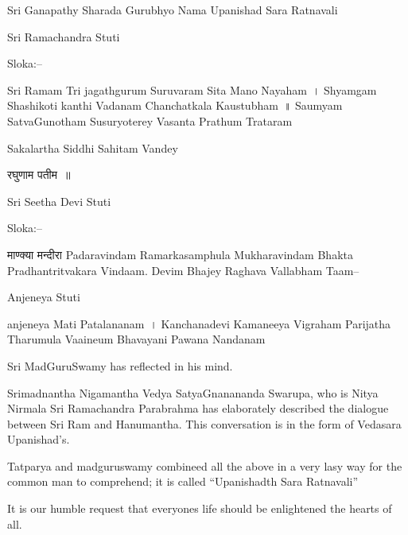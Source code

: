 
Sri Ganapathy Sharada Gurubhyo Nama Upanishad Sara Ratnavali

Sri Ramachandra Stuti

Sloka:–

 Sri Ramam Tri jagathgurum Suruvaram Sita Mano Nayaham~।
 Shyamgam Shashikoti kanthi Vadanam Chanchatkala Kaustubham~॥
 Saumyam SatvaGunotham Susuryoterey Vasanta Prathum Trataram

Sakalartha Siddhi Sahitam Vandey

रघुणाम पतीम~॥

Sri Seetha Devi Stuti

Sloka:–

 माण्क्या मन्दीरा Padaravindam
 Ramarkasamphula Mukharavindam
 Bhakta Pradhantritvakara Vindaam.
 Devim Bhajey Raghava Vallabham Taam–

Anjeneya Stuti

 anjeneya Mati Patalananam~।
 Kanchanadevi Kamaneeya Vigraham
 Parijatha Tharumula Vaaineum
 Bhavayani Pawana Nandanam

Sri MadGuruSwamy has reflected in his mind.

Srimadnantha Nigamantha Vedya SatyaGnanananda Swarupa, who is Nitya Nirmala Sri Ramachandra Parabrahma has elaborately described the dialogue between Sri Ram and Hanumantha. This conversation is in the form of Vedasara Upanishad's.

Tatparya and madguruswamy combineed all the above in a very lasy way for the common man to comprehend; it is called “Upanishadth Sara Ratnavali”

It is our humble request that everyones life should be enlightened the hearts of all.

